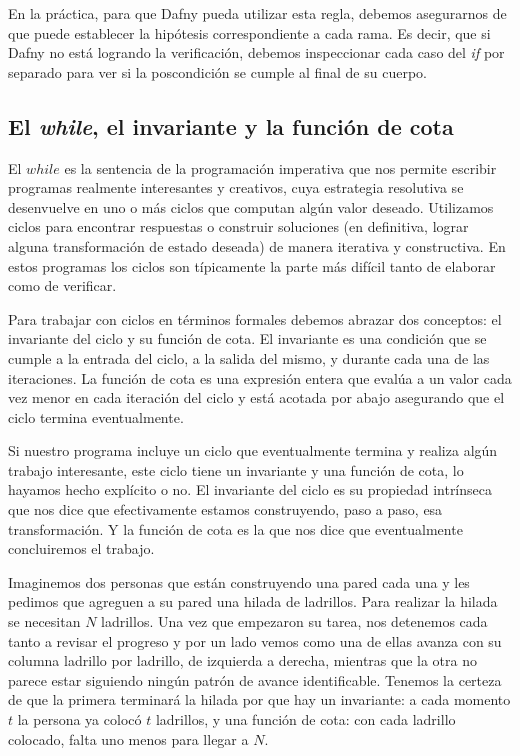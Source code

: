 \documentclass[12pt, a4paper, openany, fleqn]{book}
\begin{document}
    En la práctica, para que Dafny pueda utilizar esta regla, debemos asegurarnos de que puede establecer la hipótesis correspondiente a cada rama. Es decir, que si Dafny no está logrando la verificación, debemos inspeccionar cada caso del \textit{if} por separado para ver si la poscondición se cumple al final de su cuerpo.


    \subsection{El \textit{while}, el invariante y la función de cota}
    El $while$ es la sentencia de la programación imperativa que nos permite escribir programas realmente interesantes y creativos, cuya estrategia resolutiva se desenvuelve en uno o más ciclos que computan algún valor deseado. Utilizamos ciclos para encontrar respuestas o construir soluciones (en definitiva, lograr alguna transformación de estado deseada) de manera iterativa y constructiva. En estos programas los ciclos son típicamente la parte más difícil tanto de elaborar como de verificar.

    Para trabajar con ciclos en términos formales debemos abrazar dos conceptos: el invariante del ciclo y su función de cota.
    El invariante es una condición que se cumple a la entrada del ciclo, a la salida del mismo, y durante cada una de las iteraciones. La función de cota es una expresión entera que evalúa a un valor cada vez menor en cada iteración del ciclo y está acotada por abajo asegurando que el ciclo termina eventualmente.

    Si nuestro programa incluye un ciclo que eventualmente termina y realiza algún trabajo interesante, este ciclo tiene un invariante y una función de cota, lo hayamos hecho explícito o no. El invariante del ciclo es su propiedad intrínseca que nos dice que efectivamente estamos construyendo, paso a paso, esa transformación. Y la función de cota es la que nos dice que eventualmente concluiremos el trabajo.

    Imaginemos dos personas que están construyendo una pared cada una y les pedimos que agreguen a su pared una hilada de ladrillos. Para realizar la hilada se necesitan $N$ ladrillos. Una vez que empezaron su tarea, nos detenemos cada tanto a revisar el progreso y por un lado vemos como una de ellas avanza con su columna ladrillo por ladrillo, de izquierda a derecha, mientras que la otra no parece estar siguiendo ningún patrón de avance identificable. Tenemos la certeza de que la primera terminará la hilada por que hay un invariante: a cada momento $t$ la persona ya colocó $t$ ladrillos, y una función de cota: con cada ladrillo colocado, falta uno menos para llegar a $N$.
\end{document}
